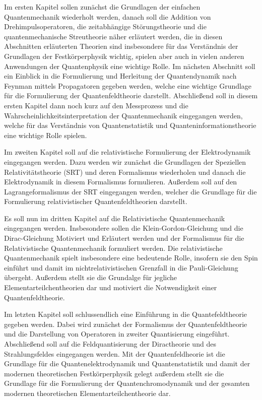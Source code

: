 \begin{itemize1}
	\item Im ersten Kapitel sollen zunächst die Grundlagen der einfachen Quantenmechanik wiederholt werden, danach soll die Addition von Drehimpulsoperatoren, die zeitabhängige Störungstheorie und die quantenmechanische Streutheorie näher erläutert werden, die in diesen Abschnitten erläuterten Theorien sind insbesondere für das Verständnis der Grundlagen der Festkörperphysik wichtig, spielen aber auch in vielen anderen Anwendungen der Quantenphysik eine wichtige Rolle. Im nächsten Abschnitt soll ein Einblick in die Formulierung und Herleitung der Quantendynamik nach Feynman mittels Propagatoren gegeben werden, welche eine wichtige Grundlage für die Formulierung der Quantenfeldtheorie darstellt. Abschließend soll in diesem ersten Kapitel dann noch kurz auf den Messprozess und die Wahrscheinlichkeitsinterpretation der Quantenmechanik eingegangen werden, welche für das Verständnis von Quantenstatistik und Quanteninformationstheorie eine wichtige Rolle spielen. 
	\item Im zweiten Kapitel soll auf die relativistische Formulierung der Elektrodynamik eingegangen werden. Dazu werden wir zunächst die Grundlagen der Speziellen Relativitätstheorie (SRT) und deren Formalismus wiederholen und danach die Elektrodynamik in diesem Formalismus formulieren. Außerdem soll auf den Lagrangeformalismus der SRT eingegangen werden, welcher die Grundlage für die Formulierung relativistischer Quantenfeldtheorien darstellt. 
	\item Es soll nun im dritten Kapitel auf die Relativistische Quantenmechanik eingegangen werden. Insbesondere sollen die Klein-Gordon-Gleichung und die Dirac-Gleichung Motiviert und Erläutert werden und der Formalismus für die Relativistische Quantenmechanik formuliert werden. Die relativistische Quantenmechanik spielt insbesondere eine bedeutende Rolle, insofern sie den Spin einführt und damit im nichtrelativistischen Grenzfall in die Pauli-Gleichung übergeht. Außerdem stellt sie die Grundalge für jegliche Elementarteilchentheorien dar und motiviert die Notwendigkeit einer Quantenfeldtheorie. 
	\item Im letzten Kapitel soll schlussendlich eine Einführung in die Quantefeldtheorie gegeben werden. Dabei wird zunächst der Formalismus der Quantenfeldtheorie und die Darstellung von Operatoren in zweiter Quantisierung eingeführt. Abschließend soll auf die Feldquantisierung der Diractheorie und des Strahlungsfeldes eingegangen werden. Mit der Quantenfeldheorie ist die Grundlage für die Quantenelektrodynamik und Quantenstatistik und damit  der modernen theoretischen Festkörperphysik gelegt außerdem stellt sie die Grundlage für die Formulierung der Quantenchromodynamik und der gesamten modernen theoretischen Elementarteilchentheorie dar. 
\end{itemize1}

